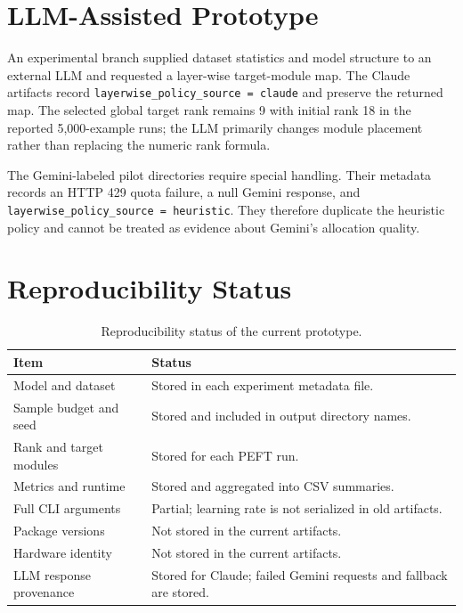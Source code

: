 \section{LLM-Assisted Prototype}

An experimental branch supplied dataset statistics and model structure to an external LLM and
requested a layer-wise target-module map. The Claude artifacts record
\texttt{layerwise\_policy\_source = claude} and preserve the returned map. The selected global
target rank remains 9 with initial rank 18 in the reported 5,000-example runs; the LLM primarily
changes module placement rather than replacing the numeric rank formula.

The Gemini-labeled pilot directories require special handling. Their metadata records an HTTP 429
quota failure, a null Gemini response, and \texttt{layerwise\_policy\_source = heuristic}. They
therefore duplicate the heuristic policy and cannot be treated as evidence about Gemini's
allocation quality.

\section{Reproducibility Status}

\begin{table}[H]
\centering
\caption{Reproducibility status of the current prototype.}
\label{tab:repro-checklist}
\begin{tabularx}{\textwidth}{@{}lX@{}}
\toprule
Item & Status \\
\midrule
Model and dataset & Stored in each experiment metadata file.\\
Sample budget and seed & Stored and included in output directory names.\\
Rank and target modules & Stored for each PEFT run.\\
Metrics and runtime & Stored and aggregated into CSV summaries.\\
Full CLI arguments & Partial; learning rate is not serialized in old artifacts.\\
Package versions & Not stored in the current artifacts.\\
Hardware identity & Not stored in the current artifacts.\\
LLM response provenance & Stored for Claude; failed Gemini requests and fallback are stored.\\
\bottomrule
\end{tabularx}
\end{table}
